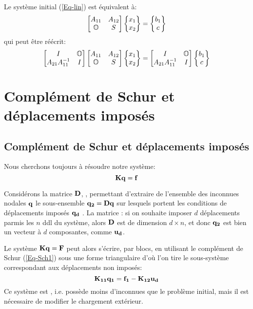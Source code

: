 \medskipvm
Le système initial (\ref{Eq-lin}) est équivalent à:
\begin{equation}\label{Eq-Sch1}
\MM*{A_{11} & A_{12}\\ \mO & S}
\VV*{x_1\\ x_2} =
\VV*{b_1\\ c}
\end{equation}
qui peut être réécrit:
\begin{equation}
\MM*{I & \mO{} \\ A_{21}A_{11}^{-1} & I}
\MM*{A_{11} & A_{12}\\ \mO{} & S}
\VV*{x_1\\ x_2} =
\MM*{I & \mO{} \\ A_{21}A_{11}^{-1} & I}
\VV*{b_1\\ c}
\end{equation}

\medskip
\ifVersionAvecExemplesSepares
   \section{Complément de Schur et déplacements imposés}
\else
   \subsection{Complément de Schur et déplacements imposés}
\fi
Nous cherchons toujours à résoudre notre système:
\begin{equation}\MM{K}\VV{q}=\VV{f}\end{equation}

\medskip
Considérons la matrice $\MM{D}$, , permettant d'extraire de l'ensemble des inconnues
nodales $\VV{q}$ le sous-ensemble $\VV{q_2}=\MM{D}\VV{q}$ sur lesquels portent les conditions de déplacements imposés $\VV{q_d}$
.
La matrice : si on souhaite imposer $d$ déplacements parmis les $n$ ddl
du système, alors $\MM{D}$ est de dimension $d\times n$, et donc $\VV{q_2}$ est bien un vecteur à $d$ composantes,
comme $\VV{u_d}$.

\medskip
Le système $\MM{K}\VV{q}=\VV{F}$ peut alors s'écrire, par blocs, en utilisant le complément de Schur (\ref{Eq-Sch1}) sous une
forme triangulaire d'où l'on tire le sous-système correspondant aux déplacements non imposés:
\begin{equation}
\MM{K_{11}}\VV{q_1} = \VV{f_1} - \MM{K_{12}}\VV{u_d}
\end{equation}
\medskipvm
Ce système est , i.e. possède moins d'inconnues que le problème initial, mais il est nécessaire de
modifier le chargement extérieur.

